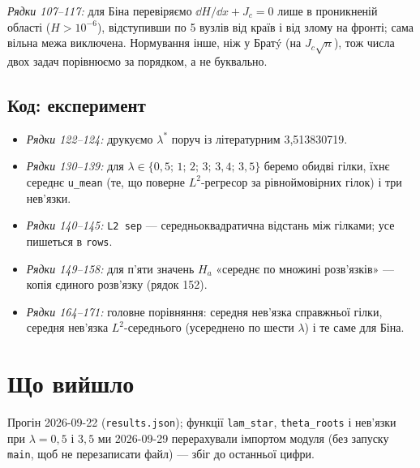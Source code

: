 
\noindent \emph{Рядки 107--117:} для Біна перевіряємо $\dd H/\dd x+J_c=0$ лише в
проникненій області ($H>10^{-6}$), відступивши по 5 вузлів від країв і від злому на фронті;
сама вільна межа виключена. Нормування інше, ніж у Братý (на $J_c\sqrt n$), тож числа двох
задач порівнюємо за порядком, а не буквально.

\subsection{Код: експеримент}


\begin{itemize}
\item \emph{Рядки 122--124:} друкуємо $\lambda^{*}$ поруч із літературним 3,513830719.
\item \emph{Рядки 130--139:} для $\lambda\in\{0{,}5;\,1;\,2;\,3;\,3{,}4;\,3{,}5\}$ беремо обидві
  гілки, їхнє середнє \texttt{u\_mean} (те, що поверне $L^2$-регресор за рівноймовірних
  гілок) і три нев'язки.
\item \emph{Рядки 140--145:} \texttt{L2 sep} --- середньоквадратична відстань між гілками;
  усе пишеться в \texttt{rows}.
\end{itemize}


\begin{itemize}
\item \emph{Рядки 149--158:} для п'яти значень $H_a$ «середнє по множині розв'язків» ---
  копія єдиного розв'язку (рядок 152).
\item \emph{Рядки 164--171:} головне порівняння: середня нев'язка справжньої гілки,
  середня нев'язка $L^2$-середнього (усереднено по шести $\lambda$) і те саме для Біна.
\end{itemize}

\section{Що вийшло}\label{sec:g03-results}

Прогін 2026-09-22 (\texttt{results.json}); функції \texttt{lam\_star}, \texttt{theta\_roots}
і нев'язки при $\lambda=0{,}5$ і $3{,}5$ ми 2026-09-29 перерахували імпортом модуля (без
запуску \texttt{main}, щоб не перезаписати файл) --- збіг до останньої цифри.

